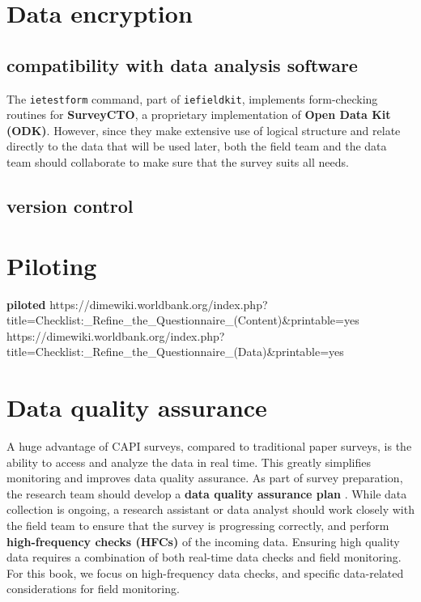 \section{Data encryption}

\subsection{compatibility with data analysis software}
The \texttt{ietestform} command, part of
\texttt{iefieldkit}, implements form-checking routines
for \textbf{SurveyCTO}, a proprietary implementation of \textbf{Open Data Kit (ODK)}.
However, since they make extensive use of logical structure and
relate directly to the data that will be used later,
both the field team and the data team should
collaborate to make sure that the survey suits all needs.\cite{krosnick2018questionnaire}

\subsection{version control}


\section{Piloting}
\textbf{piloted}
https://dimewiki.worldbank.org/index.php?title=Checklist:_Refine_the_Questionnaire_(Content)&printable=yes
https://dimewiki.worldbank.org/index.php?title=Checklist:_Refine_the_Questionnaire_(Data)&printable=yes


\section{Data quality assurance}

A huge advantage of CAPI surveys, compared to traditional paper surveys, is the ability to access and analyze the data in real time. 
This greatly simplifies monitoring and improves data quality assurance. As part of survey preparation, the research team should develop a 
\textbf{data quality assurance plan} . While data collection is ongoing, a research assistant or data analyst should work closely with the field team to ensure that the survey is progressing correctly, and perform \textbf{high-frequency checks (HFCs)} of the incoming data. 
Ensuring high quality data requires a combination of both real-time data checks and field monitoring. For this book, we focus on high-frequency data checks, and specific data-related considerations for field monitoring.

